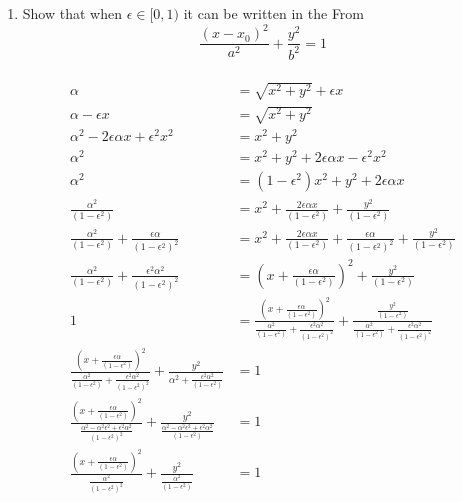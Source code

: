 \documentclass{article}
\begin{document}
\begin{enumerate}
\begin{enumerate}
            \item Show that when $\epsilon \in [0,1)$ it can be written in the From
            \[
            \frac{(x - x_0)^2}{a^2} + \frac{y^2}{b^2} = 1
            \]\\

            \begin{align*}
                \alpha &= \sqrt{x^2+y^2} + \epsilon x \\
                \alpha - \epsilon x &= \sqrt{x^2 + y^2} \\
                \alpha^2 - 2\epsilon\alpha x + \epsilon^2 x^2 &= x^2 +y^2 \\
                \alpha^2 &= x^2 +y^2 + 2\epsilon\alpha x - \epsilon^2 x^2 \\
                \alpha^2 &= (1 - \epsilon^2)x^2+ y^2 + 2\epsilon\alpha x \\
                \frac{\alpha^2}{(1 - \epsilon^2)} &= x^2 + \frac{2\epsilon\alpha x}{(1 - \epsilon^2)} + \frac{y^2}{(1 - \epsilon^2)} \\
                \frac{\alpha^2}{(1 - \epsilon^2)} + \frac{\epsilon \alpha}{(1-\epsilon^2)^2} &= x^2 + \frac{2\epsilon\alpha x}{(1 - \epsilon^2)} + \frac{\epsilon \alpha}{(1-\epsilon^2)^2} + \frac{y^2}{(1 - \epsilon^2)} \\
                \frac{\alpha^2}{(1 - \epsilon^2)} + \frac{\epsilon^2 \alpha^2}{(1-\epsilon^2)^2} &= (x + \frac{\epsilon \alpha}{(1-\epsilon^2)})^2 + \frac{y^2}{(1 - \epsilon^2)} \\
                1 &= \frac{(x + \frac{\epsilon \alpha}{(1-\epsilon^2)})^2}{\frac{\alpha^2}{(1 - \epsilon^2)} + \frac{\epsilon^2 \alpha^2}{(1-\epsilon^2)^2}} + \frac{\frac{y^2}{(1 - \epsilon^2)}}{\frac{\alpha^2}{(1 - \epsilon^2)} + \frac{\epsilon^2 \alpha^2}{(1-\epsilon^2)^2}} \\
                \frac{(x + \frac{\epsilon \alpha}{(1-\epsilon^2)})^2}{\frac{\alpha^2}{(1 - \epsilon^2)} + \frac{\epsilon^2 \alpha^2}{(1-\epsilon^2)^2}} + \frac{ y^2}{\alpha^2+ \frac{\epsilon^2 \alpha^2}{(1-\epsilon^2)}}  &= 1 \\
                \frac{(x + \frac{\epsilon \alpha}{(1-\epsilon^2)})^2}{\frac{\alpha^2 - \alpha^2 \epsilon^2 +\epsilon^2 \alpha^2}{(1-\epsilon^2)^2}} + \frac{ y^2}{\frac{\alpha^2 - \alpha^2 \epsilon^2 + \epsilon^2 \alpha^2}{(1-\epsilon^2)}}  &= 1 \\
                \frac{(x + \frac{\epsilon \alpha}{(1-\epsilon^2)})^2}{\frac{\alpha^2}{(1-\epsilon^2)^2}} + \frac{ y^2}{\frac{\alpha^2}{(1-\epsilon^2)}}  &= 1
            \end{align*}


\end{enumerate}
\end{enumerate}
\end{document}
